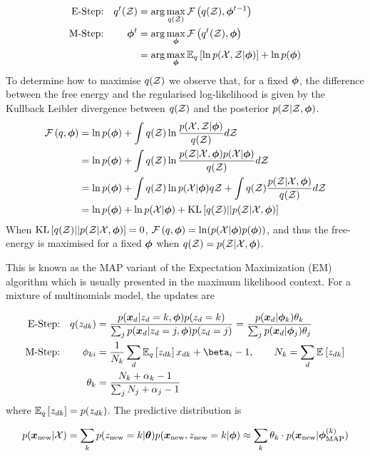 \begin{align}
\text{E-Step:} & & q^t(\zdat) & = \arg \max_{q(\zdat)} \fqt{q(\zdat), \param^{t-1}} \\
\text{M-Step:} & & \param^t & = \arg \max_{\param} \fqt{q^t(\zdat), \param} \\
& & & = \arg \max_{\param} \exlogjoint{q} + \ln p(\param)
\end{align}
To determine how to maximise $q(\zdat)$ we observe that, for a fixed $\param$, the difference between the free energy and the regularised log-likelihood is given by the Kullback Leibler divergence between $q(\zdat)$ and the posterior $p(\zdat|\zdat, \param)$.
\begin{align}
\fqt{q, \param} 
& = \ln p(\param) + \int q(\zdat) \ln \frac{p(\xdat, \zdat|\param)}{q(\zdat)} d\zdat \\
& = \ln p(\param) + \int q(\zdat) \ln \frac{p(\zdat|\xdat, \param)p(\xdat | \param)}{q(\zdat)} d\zdat \\
& = \ln p(\param) + \int q(\zdat) \ln p(\xdat | \param) q\zdat + \int q(\zdat)\frac{p(\zdat|\xdat, \param)}{q(\zdat)} d\zdat \\
& = \ln p(\param) + \ln p(\xdat | \param) + \kl{q(\zdat)}{p(\zdat|\xdat, \param)}
\end{align}
When $\kl{q(\zdat)}{p(\zdat|\xdat, \param)} = 0$, $\fqt{q, \param} = \ln(p(\xdat | \param)p(\param))$, and thus the free-energy is maximised for a fixed $\param$ when $q(\zdat) = p(\zdat | \xdat, \param)$.

This is known as the MAP variant of the Expectation Maximization (EM) algorithm which is usually presented in the maximum likelihood context\cite{Dempster1977}. For a mixture of multinomials model, the updates are

\begin{align}
\text{E-Step:} & & q(z_{dk}) 
& = \frac{p(\xd|z_d = k, \param)p(z_d = k)}{\sum_j p(\xd|z_d = j, \param)p(z_d = j)} 
= \frac{p(\xd | \param_k) \theta_k}{\sum_j p(\xd | \param_j) \theta_j}  \\
\text{M-Step:} 
& & \phi_{ki} & = \frac{1}{N_k} \sum_d \ex{z_{dk}}{q} x_{dk} + \beta_i - 1, \qquad N_k = \sum_d \ex{z_{dk}}{} \\
& & \theta_k & =  \frac{N_k + \alpha_k - 1}{\sum_j N_j + \alpha_j - 1}
\end{align}
where $\ex{z_{dk}}{q} = p(z_{dk})$. The predictive distribution is

\begin{align}
p(\xnew | \xdat)  = \sum_k p(z_{\text{new}} = k | \vv{\theta}) p(\xnew, z_{\text{new}} = k | \param) 
\approx \sum_k \theta_k \cdot p(\xnew | \param^{(k)}_{\text{MAP}})
\end{align}

